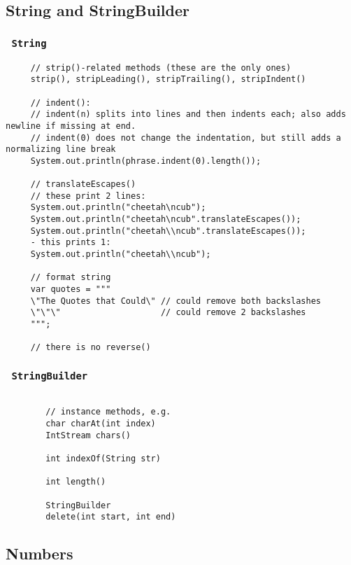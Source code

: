 \documentclass{scrartcl}
\begin{document}
 \subsection{String and StringBuilder}
 \subsubsection{\lstinline$ String $}

    \begin{lstlisting}
     // strip()-related methods (these are the only ones)
     strip(), stripLeading(), stripTrailing(), stripIndent()

     // indent():
     // indent(n) splits into lines and then indents each; also adds newline if missing at end.
     // indent(0) does not change the indentation, but still adds a normalizing line break
     System.out.println(phrase.indent(0).length());

     // translateEscapes()
     // these print 2 lines:
     System.out.println("cheetah\ncub");
     System.out.println("cheetah\ncub".translateEscapes());
     System.out.println("cheetah\\ncub".translateEscapes());
     - this prints 1:
     System.out.println("cheetah\\ncub");

     // format string
     var quotes = """
     \"The Quotes that Could\" // could remove both backslashes
     \"\"\"                    // could remove 2 backslashes
     """;

     // there is no reverse()
     \end{lstlisting}

 \subsubsection{\lstinline$ StringBuilder $}

    \begin{lstlisting}

        // instance methods, e.g.
        char charAt(int index)
        IntStream chars()

        int indexOf(String str)

        int length()

        StringBuilder
        delete(int start, int end)
    \end{lstlisting}

\subsection{Numbers}
\end{document}
